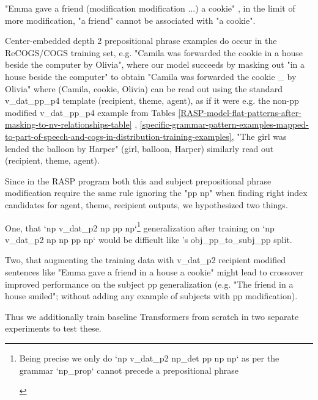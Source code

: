 \documentclass[11pt]{article}
\begin{document}
{\begin{footnotesize}
"Emma gave a friend (modification modification ...) a cookie" , in the limit of more modification, "a friend" cannot be associated with "a cookie".

Center-embedded depth 2 prepositional phrase examples do occur in the ReCOGS/COGS training set, e.g. "Camila was forwarded the cookie in a house beside the computer by Olivia", where our model succeeds by masking out "in a house beside the computer" to obtain "Camila was forwarded the cookie \_ by Olivia" where (Camila, cookie, Olivia) can be read out using the standard v\_dat\_pp\_p4 template (recipient, theme, agent), as if it were e.g. the non-pp modified v\_dat\_pp\_p4 example from Tables \ref{RASP-model-flat-patterns-after-masking-to-nv-relationships-table} , \ref{specific-grammar-pattern-examples-mapped-to-part-of-speech-and-cogs-in-distribution-training-examples}, "The girl was lended the balloon by Harper" (girl, balloon, Harper) similarly read out (recipient, theme, agent).
\end{footnotesize}}

Since in the RASP program both this and subject prepositional phrase modification require the same rule ignoring the "pp np" when finding right index candidates for agent, theme, recipient outputs, we hypothesized two things.

One, that `np v\_dat\_p2 np pp np`\footnote{\begin{footnotesize}Being precise we only do `np v\_dat\_p2 np\_det pp np np` as per the grammar `np\_prop` cannot precede a prepositional phrase\end{footnotesize}} generalization after training on `np v\_dat\_p2 np np pp np` would be difficult like \cite{Wu2023}'s obj\_pp\_to\_subj\_pp split.

Two, that augmenting the training data with v\_dat\_p2 recipient modified sentences like "Emma gave a friend in a house a cookie" might lead to crossover improved performance on the subject pp generalization (e.g. "The friend in a house smiled"; without adding any example of subjects with pp modification).

Thus we additionally train \cite{Wu2023} baseline Transformers from scratch in two separate experiments to test these.
\end{document}
